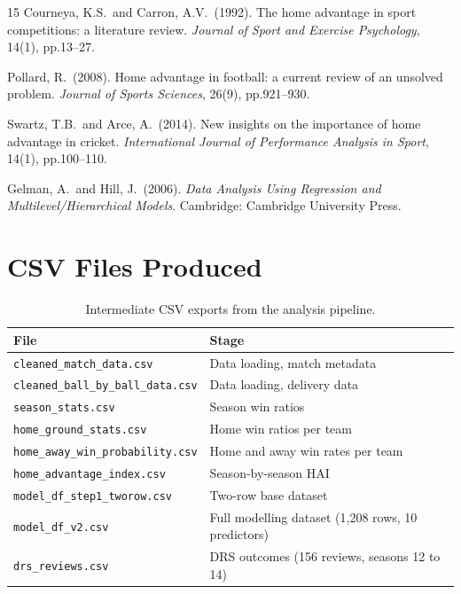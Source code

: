 \documentclass[12pt,a4paper]{article}
\begin{document}
\begin{thebibliography}{15}
Courneya, K.S.\ and Carron, A.V.\ (1992). The home advantage in sport competitions: a
literature review. \textit{Journal of Sport and Exercise Psychology}, 14(1), pp.13--27.

Pollard, R.\ (2008). Home advantage in football: a current review of an unsolved problem.
\textit{Journal of Sports Sciences}, 26(9), pp.921--930.

Swartz, T.B.\ and Arce, A.\ (2014). New insights on the importance of home advantage in
cricket. \textit{International Journal of Performance Analysis in Sport}, 14(1), pp.100--110.

Gelman, A.\ and Hill, J.\ (2006). \textit{Data Analysis Using Regression and
Multilevel/Hierarchical Models}. Cambridge: Cambridge University Press.

\end{thebibliography}

\appendix
\section{CSV Files Produced}

\begin{table}[H]
\centering
\caption{Intermediate CSV exports from the analysis pipeline.}
\begin{tabular}{ll}
\toprule
\textbf{File} & \textbf{Stage} \\
\midrule
\texttt{cleaned\_match\_data.csv}        & Data loading, match metadata \\
\texttt{cleaned\_ball\_by\_ball\_data.csv} & Data loading, delivery data \\
\texttt{season\_stats.csv}               & Season win ratios \\
\texttt{home\_ground\_stats.csv}          & Home win ratios per team \\
\texttt{home\_away\_win\_probability.csv} & Home and away win rates per team \\
\texttt{home\_advantage\_index.csv}       & Season-by-season HAI \\
\texttt{model\_df\_step1\_tworow.csv}    & Two-row base dataset \\
\texttt{model\_df\_v2.csv}               & Full modelling dataset (1,208 rows, 10 predictors) \\
\texttt{drs\_reviews.csv}                & DRS outcomes (156 reviews, seasons 12 to 14) \\
\bottomrule
\end{tabular}
\end{table}
\end{document}
